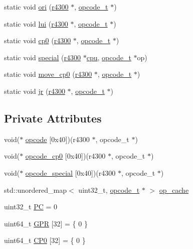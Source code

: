\begin{DoxyCompactItemize}
\item 
static void \hyperlink{classultra64_1_1r4300_a170dd0a135bf08858d2f1c26fe5e9404}{ori} (\hyperlink{classultra64_1_1r4300}{r4300} $\ast$, \hyperlink{classultra64_1_1opcode__t}{opcode\+\_\+t} $\ast$)
\item 
static void \hyperlink{classultra64_1_1r4300_a19756cc385281c4ac11bc65bb296b839}{lui} (\hyperlink{classultra64_1_1r4300}{r4300} $\ast$, \hyperlink{classultra64_1_1opcode__t}{opcode\+\_\+t} $\ast$)
\item 
static void \hyperlink{classultra64_1_1r4300_aa5eb004d0ce043c3ab85fb59b28fb4aa}{cp0} (\hyperlink{classultra64_1_1r4300}{r4300} $\ast$, \hyperlink{classultra64_1_1opcode__t}{opcode\+\_\+t} $\ast$)
\item 
static void \hyperlink{classultra64_1_1r4300_aeb7775275197e58bc21e3b801567120e}{special} (\hyperlink{classultra64_1_1r4300}{r4300} $\ast$\hyperlink{ultra64_8cpp_a677caae84e52c421b81b49cb6a69ef0a}{cpu}, \hyperlink{classultra64_1_1opcode__t}{opcode\+\_\+t} $\ast$op)
\item 
static void \hyperlink{classultra64_1_1r4300_a457c88d75755b9ce42535991bff3bc2b}{move\+\_\+cp0} (\hyperlink{classultra64_1_1r4300}{r4300} $\ast$, \hyperlink{classultra64_1_1opcode__t}{opcode\+\_\+t} $\ast$)
\item 
static void \hyperlink{classultra64_1_1r4300_ab3f62c08f1214444ba533ba060f97158}{jr} (\hyperlink{classultra64_1_1r4300}{r4300} $\ast$, \hyperlink{classultra64_1_1opcode__t}{opcode\+\_\+t} $\ast$)
\end{DoxyCompactItemize}
\subsection*{Private Attributes}
\begin{DoxyCompactItemize}
\item 
void($\ast$ \hyperlink{classultra64_1_1r4300_aeea1d2c123e7e27cb261d062d4699917}{opcode} \mbox{[}0x40\mbox{]})(r4300 $\ast$, opcode\+\_\+t $\ast$)
\item 
void($\ast$ \hyperlink{classultra64_1_1r4300_a38160774fdd1ec6687832b14c90c4152}{opcode\+\_\+cp0} \mbox{[}0x40\mbox{]})(r4300 $\ast$, opcode\+\_\+t $\ast$)
\item 
void($\ast$ \hyperlink{classultra64_1_1r4300_aa2150b1c7f087ae60b2073c76e3b9ddf}{opcode\+\_\+special} \mbox{[}0x40\mbox{]})(r4300 $\ast$, opcode\+\_\+t $\ast$)
\item 
std\+::unordered\+\_\+map$<$ uint32\+\_\+t, \hyperlink{classultra64_1_1opcode__t}{opcode\+\_\+t} $\ast$ $>$ \hyperlink{classultra64_1_1r4300_a642f9bf0115e5e788fac5ce3e126f2d5}{op\+\_\+cache}
\item 
uint32\+\_\+t \hyperlink{classultra64_1_1r4300_a71741e855672becf47a53076f5eb181e}{PC} = 0
\item 
uint64\+\_\+t \hyperlink{classultra64_1_1r4300_a21cf61283366a864dfd155cf2356298a}{G\+PR} \mbox{[}32\mbox{]} = \{ 0 \}
\item 
uint64\+\_\+t \hyperlink{classultra64_1_1r4300_a2065a087ba0a3e75d173fdf9920735bb}{C\+P0} \mbox{[}32\mbox{]} = \{ 0 \}
\end{DoxyCompactItemize}


